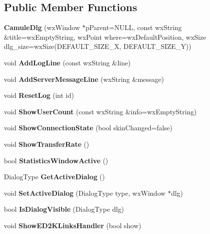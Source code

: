 \subsection*{Public Member Functions}
\begin{DoxyCompactItemize}
\item 
{\bfseries CamuleDlg} (wxWindow $\ast$pParent=NULL, const wxString \&title=wxEmptyString, wxPoint where=wxDefaultPosition, wxSize dlg\_\-size=wxSize(DEFAULT\_\-SIZE\_\-X, DEFAULT\_\-SIZE\_\-Y))\label{classCamuleDlg_a4482434d60519e56a994867fd5f9203a}

\item 
void {\bfseries AddLogLine} (const wxString \&line)\label{classCamuleDlg_a1025e864a57e995c58d0449e23388806}

\item 
void {\bfseries AddServerMessageLine} (wxString \&message)\label{classCamuleDlg_a27f8d9ec8e998c6449e9c867be782f23}

\item 
void {\bfseries ResetLog} (int id)\label{classCamuleDlg_a7990c9f019d9a32d180ad5ca8af12e2e}

\item 
void {\bfseries ShowUserCount} (const wxString \&info=wxEmptyString)\label{classCamuleDlg_a4427e9baf2e81fecf0e796fa76fca434}

\item 
void {\bfseries ShowConnectionState} (bool skinChanged=false)\label{classCamuleDlg_a812f17a1a121a35b1fda032731900ad4}

\item 
void {\bfseries ShowTransferRate} ()\label{classCamuleDlg_af1d4f31408c0f55ec12c207cb8431fa7}

\item 
bool {\bfseries StatisticsWindowActive} ()\label{classCamuleDlg_ad14f4eb8977fd6e6505c80f8b890d78e}

\item 
DialogType {\bfseries GetActiveDialog} ()\label{classCamuleDlg_a61e1994998d85f49b62dc4f4a1227a09}

\item 
void {\bfseries SetActiveDialog} (DialogType type, wxWindow $\ast$dlg)\label{classCamuleDlg_ae719ad31db1ca438edfd3aab558285c5}

\item 
bool {\bf IsDialogVisible} (DialogType dlg)
\item 
void {\bfseries ShowED2KLinksHandler} (bool show)\label{classCamuleDlg_aba9f1ab0fc789a3e9ee675cb7d19be23}


\end{DoxyCompactItemize}
